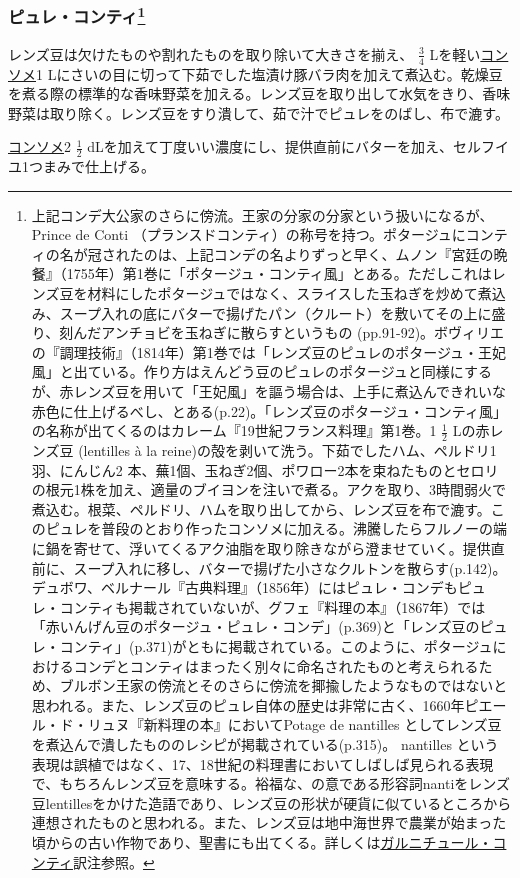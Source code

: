 \begin{recette}
\hypertarget{puree-conti}{%
\subsubsection[ピュレ・コンティ]{\texorpdfstring{ピュレ・コンティ\footnote{上記コンデ大公家のさらに傍流。王家の分家の分家という扱いになるが、
  Prince de Conti
  （プランスドコンティ）の称号を持つ。ポタージュにコンティの名が冠されたのは、上記コンデの名よりずっと早く、ムノン『宮廷の晩餐』（1755年）第1巻に「ポタージュ・コンティ風」とある。ただしこれはレンズ豆を材料にしたポタージュではなく、スライスした玉ねぎを炒めて煮込み、スープ入れの底にバターで揚げたパン（クルート）を敷いてその上に盛り、刻んだアンチョビを玉ねぎに散らすというもの
  (pp.91-92)。ボヴィリエの『調理技術』（1814年）第1巻では「レンズ豆のピュレのポタージュ・王妃風」と出ている。作り方はえんどう豆のピュレのポタージュと同様にするが、赤レンズ豆を用いて「王妃風」を謳う場合は、上手に煮込んできれいな赤色に仕上げるべし、とある(p.22)。「レンズ豆のポタージュ・コンティ風」の名称が出てくるのはカレーム『19世紀フランス料理』第1巻。1
  \(\frac{1}{2}\) Lの赤レンズ豆 (lentilles à la
  reine)の殻を剥いて洗う。下茹でしたハム、ペルドリ1羽、にんじん2
  本、蕪1個、玉ねぎ2個、ポワロー2本を束ねたものとセロリの根元1株を加え、適量のブイヨンを注いで煮る。アクを取り、3時間弱火で煮込む。根菜、ペルドリ、ハムを取り出してから、レンズ豆を布で漉す。このピュレを普段のとおり作ったコンソメに加える。沸騰したらフルノーの端に鍋を寄せて、浮いてくるアク油脂を取り除きながら澄ませていく。提供直前に、スープ入れに移し、バターで揚げた小さなクルトンを散らす(p.142)。デュボワ、ベルナール『古典料理』（1856年）にはピュレ・コンデもピュレ・コンティも掲載されていないが、グフェ『料理の本』（1867年）では「赤いんげん豆のポタージュ・ピュレ・コンデ」(p.369)と「レンズ豆のピュレ・コンティ」(p.371)がともに掲載されている。このように、ポタージュにおけるコンデとコンティはまったく別々に命名されたものと考えられるため、ブルボン王家の傍流とそのさらに傍流を揶揄したようなものではないと思われる。また、レンズ豆のピュレ自体の歴史は非常に古く、1660年ピエール・ド・リュヌ『新料理の本』においてPotage
  de nantilles
  としてレンズ豆を煮込んで潰したもののレシピが掲載されている(p.315)。
  nantilles
  という表現は誤植ではなく、17、18世紀の料理書においてしばしば見られる表現で、もちろんレンズ豆を意味する。裕福な、の意である形容詞nantiをレンズ豆lentillesをかけた造語であり、レンズ豆の形状が硬貨に似ているところから連想されたものと思われる。また、レンズ豆は地中海世界で農業が始まった頃からの古い作物であり、聖書にも出てくる。詳しくは\protect\hyperlink{garniture-conti}{ガルニチュール・コンティ}訳注参照。}}{ピュレ・コンティ}}\label{puree-conti}}

レンズ豆は欠けたものや割れたものを取り除いて大きさを揃え、
\(\frac{3}{4}\)
Lを軽い\protect\hyperlink{consomme-blanc-simple}{コンソメ}1
Lにさいの目に切って下茹でした塩漬け豚バラ肉を加えて煮込む。乾燥豆を煮る際の標準的な香味野菜を加える。レンズ豆を取り出して水気をきり、香味野菜は取り除く。レンズ豆をすり潰して、茹で汁でピュレをのばし、布で漉す。

\protect\hyperlink{consomme-ordinaire}{コンソメ}2 \(\frac{1}{2}\)
dLを加えて丁度いい濃度にし、提供直前にバターを加え、セルフイユ1つまみで仕上げる。
\end{recette}

